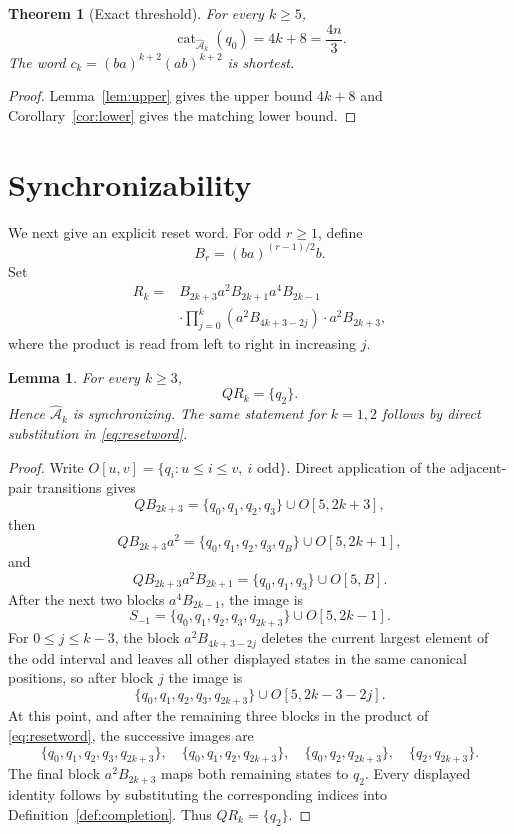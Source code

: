 \documentclass[11pt]{article}
\newtheorem{theorem}{Theorem}
\newtheorem{lemma}{Lemma}
\theoremstyle{definition}
\theoremstyle{remark}
\newcommand{\Ahat}{\widehat{\mathcal A}}
\newcommand{\cat}{\operatorname{cat}}
\begin{document}
\begin{theorem}[Exact threshold]\label{thm:main}
For every $k\ge5$,
\[
 \cat_{\Ahat_k}(q_0)=4k+8=\frac{4n}{3}.
\]
The word $c_k=(ba)^{k+2}(ab)^{k+2}$ is shortest.
\end{theorem}

\begin{proof}
Lemma~\ref{lem:upper} gives the upper bound $4k+8$ and Corollary~\ref{cor:lower} gives the matching lower bound.
\end{proof}

\section{Synchronizability}
We next give an explicit reset word. For odd $r\ge1$, define
\[
 B_r=(ba)^{(r-1)/2}b.
\]
Set
\[
\begin{aligned}
R_k={}&B_{2k+3}a^2B_{2k+1}a^4B_{2k-1}\\
&\cdot\prod_{j=0}^{k}\left(a^2B_{4k+3-2j}\right)\cdot a^2B_{2k+3},
\end{aligned}
\tag{2}\label{eq:resetword}
\]
where the product is read from left to right in increasing $j$.

\begin{lemma}\label{lem:reset}
For every $k\ge3$,
\[
 QR_k=\{q_2\}.
\]
Hence $\Ahat_k$ is synchronizing. The same statement for $k=1,2$ follows by direct substitution in \eqref{eq:resetword}.
\end{lemma}

\begin{proof}
Write $O[u,v]=\{q_i:u\le i\le v,\ i\text{ odd}\}$. Direct application of the adjacent-pair transitions gives
\[
QB_{2k+3}=\{q_0,q_1,q_2,q_3\}\cup O[5,2k+3],
\]
then
\[
QB_{2k+3}a^2=\{q_0,q_1,q_2,q_3,q_B\}\cup O[5,2k+1],
\]
and
\[
QB_{2k+3}a^2B_{2k+1}
=\{q_0,q_1,q_3\}\cup O[5,B].
\]
After the next two blocks $a^4B_{2k-1}$, the image is
\[
S_{-1}=\{q_0,q_1,q_2,q_3,q_{2k+3}\}\cup O[5,2k-1].
\]
For $0\le j\le k-3$, the block $a^2B_{4k+3-2j}$ deletes the current largest element of the odd interval and leaves all other displayed states in the same canonical positions, so after block $j$ the image is
\[
\{q_0,q_1,q_2,q_3,q_{2k+3}\}\cup O[5,2k-3-2j].
\]
At this point, and after the remaining three blocks in the product of \eqref{eq:resetword}, the successive images are
\[
\{q_0,q_1,q_2,q_3,q_{2k+3}\},
\quad
\{q_0,q_1,q_2,q_{2k+3}\},
\quad
\{q_0,q_2,q_{2k+3}\},
\quad
\{q_2,q_{2k+3}\}.
\]
The final block $a^2B_{2k+3}$ maps both remaining states to $q_2$. Every displayed identity follows by substituting the corresponding indices into Definition~\ref{def:completion}. Thus $QR_k=\{q_2\}$.
\end{proof}
\end{document}
